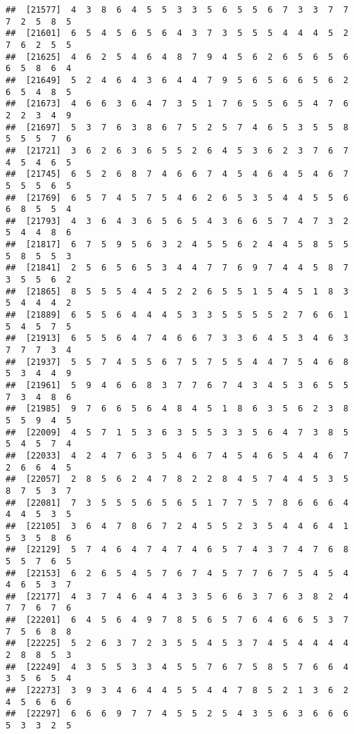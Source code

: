 \documentclass[
]{book}
\begin{document}
\begin{verbatim}
##  [21577]  4  3  8  6  4  5  5  3  3  5  6  5  5  6  7  3  3  7  7  7  2  5  8  5
##  [21601]  6  5  4  5  6  5  6  4  3  7  3  5  5  5  4  4  4  5  2  7  6  2  5  5
##  [21625]  4  6  2  5  4  6  4  8  7  9  4  5  6  2  6  5  6  5  6  6  5  8  6  4
##  [21649]  5  2  4  6  4  3  6  4  4  7  9  5  6  5  6  6  5  6  2  6  5  4  8  5
##  [21673]  4  6  6  3  6  4  7  3  5  1  7  6  5  5  6  5  4  7  6  2  2  3  4  9
##  [21697]  5  3  7  6  3  8  6  7  5  2  5  7  4  6  5  3  5  5  8  5  5  5  7  6
##  [21721]  3  6  2  6  3  6  5  5  2  6  4  5  3  6  2  3  7  6  7  4  5  4  6  5
##  [21745]  6  5  2  6  8  7  4  6  6  7  4  5  4  6  4  5  4  6  7  5  5  5  6  5
##  [21769]  6  5  7  4  5  7  5  4  6  2  6  5  3  5  4  4  5  5  6  6  8  5  5  4
##  [21793]  4  3  6  4  3  6  5  6  5  4  3  6  6  5  7  4  7  3  2  5  4  4  8  6
##  [21817]  6  7  5  9  5  6  3  2  4  5  5  6  2  4  4  5  8  5  5  5  8  5  5  3
##  [21841]  2  5  6  5  6  5  3  4  4  7  7  6  9  7  4  4  5  8  7  3  5  5  6  2
##  [21865]  8  5  5  5  4  4  5  2  2  6  5  5  1  5  4  5  1  8  3  5  4  4  4  2
##  [21889]  6  5  5  6  4  4  4  5  3  3  5  5  5  5  2  7  6  6  1  5  4  5  7  5
##  [21913]  6  5  5  6  4  7  4  6  6  7  3  3  6  4  5  3  4  6  3  7  7  7  3  4
##  [21937]  5  5  7  4  5  5  6  7  5  7  5  5  4  4  7  5  4  6  8  5  3  4  4  9
##  [21961]  5  9  4  6  6  8  3  7  7  6  7  4  3  4  5  3  6  5  5  7  3  4  8  6
##  [21985]  9  7  6  6  5  6  4  8  4  5  1  8  6  3  5  6  2  3  8  5  5  9  4  5
##  [22009]  4  5  7  1  5  3  6  3  5  5  3  3  5  6  4  7  3  8  5  5  4  5  7  4
##  [22033]  4  2  4  7  6  3  5  4  6  7  4  5  4  6  5  4  4  6  7  2  6  6  4  5
##  [22057]  2  8  5  6  2  4  7  8  2  2  8  4  5  7  4  4  5  3  5  8  7  5  3  7
##  [22081]  7  3  5  5  5  6  5  6  5  1  7  7  5  7  8  6  6  6  4  4  4  5  3  5
##  [22105]  3  6  4  7  8  6  7  2  4  5  5  2  3  5  4  4  6  4  1  5  3  5  8  6
##  [22129]  5  7  4  6  4  7  4  7  4  6  5  7  4  3  7  4  7  6  8  5  5  7  6  5
##  [22153]  6  2  6  5  4  5  7  6  7  4  5  7  7  6  7  5  4  5  4  4  6  5  3  7
##  [22177]  4  3  7  4  6  4  4  3  3  5  6  6  3  7  6  3  8  2  4  7  7  6  7  6
##  [22201]  6  4  5  6  4  9  7  8  5  6  5  7  6  4  6  6  5  3  7  7  5  6  8  8
##  [22225]  5  2  6  3  7  2  3  5  5  4  5  3  7  4  5  4  4  4  4  2  8  8  5  3
##  [22249]  4  3  5  5  3  3  4  5  5  7  6  7  5  8  5  7  6  6  4  3  5  6  5  4
##  [22273]  3  9  3  4  6  4  4  5  5  4  4  7  8  5  2  1  3  6  2  4  5  6  6  6
##  [22297]  6  6  6  9  7  7  4  5  5  2  5  4  3  5  6  3  6  6  6  5  3  3  2  5

\end{verbatim}
\end{document}
